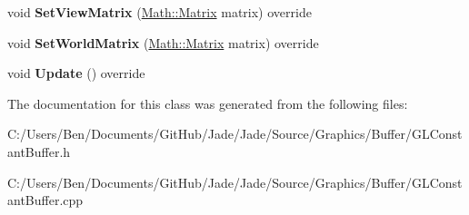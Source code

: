 \begin{DoxyCompactItemize}
\item 
\hypertarget{class_jade_1_1_graphics_1_1_g_l_constant_buffer_a3f1b19332e2c9c722fefda645cc17bd7}{}void {\bfseries Set\+View\+Matrix} (\hyperlink{struct_jade_1_1_math_1_1_matrix}{Math\+::\+Matrix} matrix) override\label{class_jade_1_1_graphics_1_1_g_l_constant_buffer_a3f1b19332e2c9c722fefda645cc17bd7}

\item 
\hypertarget{class_jade_1_1_graphics_1_1_g_l_constant_buffer_abb593360ab818e716b23b034261e3809}{}void {\bfseries Set\+World\+Matrix} (\hyperlink{struct_jade_1_1_math_1_1_matrix}{Math\+::\+Matrix} matrix) override\label{class_jade_1_1_graphics_1_1_g_l_constant_buffer_abb593360ab818e716b23b034261e3809}

\item 
\hypertarget{class_jade_1_1_graphics_1_1_g_l_constant_buffer_a87e7d38c386290df46739be6dcf8410b}{}void {\bfseries Update} () override\label{class_jade_1_1_graphics_1_1_g_l_constant_buffer_a87e7d38c386290df46739be6dcf8410b}

\end{DoxyCompactItemize}


The documentation for this class was generated from the following files\+:\begin{DoxyCompactItemize}
\item 
C\+:/\+Users/\+Ben/\+Documents/\+Git\+Hub/\+Jade/\+Jade/\+Source/\+Graphics/\+Buffer/G\+L\+Constant\+Buffer.\+h\item 
C\+:/\+Users/\+Ben/\+Documents/\+Git\+Hub/\+Jade/\+Jade/\+Source/\+Graphics/\+Buffer/G\+L\+Constant\+Buffer.\+cpp\end{DoxyCompactItemize}
